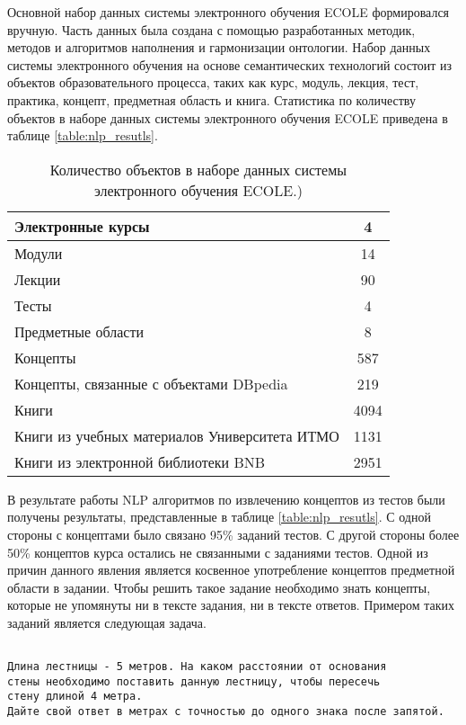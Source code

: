 Основной набор данных системы электронного обучения ECOLE формировался вручную. Часть данных была создана с помощью разработанных методик, методов  и алгоритмов наполнения и гармонизации онтологии. Набор данных системы электронного обучения на основе семантических технологий состоит из объектов образовательного процесса, таких как курс, модуль, лекция, тест, практика, концепт, предметная область и книга. Статистика по количеству объектов в наборе данных системы электронного обучения ECOLE приведена в таблице  \ref{table:nlp_resutls}.

\begin{table}[h!]
\centering
\caption{Количество объектов в наборе данных системы электронного обучения ECOLE.)}
\label{table:dataset_num}
\begin{tabular}{ |p{9cm}|c|  }
\hline Электронные курсы & 4 \\
\hline Модули & 14 \\
\hline Лекции & 90 \\
\hline Тесты & 4 \\
\hline Предметные области & 8 \\
\hline Концепты & 587 \\
\hline Концепты, связанные с объектами DBpedia & 219 \\
\hline Книги & 4094 \\
\hline Книги из учебных материалов Университета ИТМО & 1131 \\
\hline Книги из электронной библиотеки BNB & 2951 \\
\hline
\end{tabular}
\end{table}

В результате работы NLP алгоритмов по извлечению концептов из тестов были получены результаты, представленные в таблице \ref{table:nlp_resutls}. С одной стороны с концептами было связано 95\% заданий тестов. С другой стороны более 50\% концептов курса остались не связанными с заданиями тестов. Одной из причин данного явления является косвенное употребление концептов предметной области в задании. Чтобы решить такое задание необходимо знать концепты, которые не упомянуты ни в тексте задания, ни в тексте ответов. Примером таких заданий является следующая задача.

\begin{verbatim}

Длина лестницы - 5 метров. На каком расстоянии от основания 
стены необходимо поставить данную лестницу, чтобы пересечь
стену длиной 4 метра. 
Дайте свой ответ в метрах с точностью до одного знака после запятой.

\end{verbatim}

